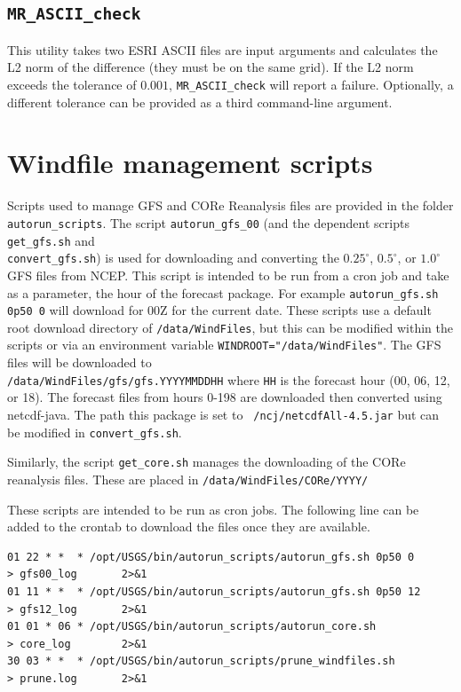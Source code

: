 \documentclass[11pt]{article}   %
\begin{document}
\subsection{\texttt{MR\_ASCII\_check}}
This utility takes two ESRI ASCII files are input arguments and calculates the L2 norm of
the difference (they must be on the same grid).  If the L2 norm exceeds the tolerance of
$0.001$, \texttt{MR\_ASCII\_check} will report a failure.  Optionally, a different tolerance
can be provided as a third command-line argument.

\section{Windfile management scripts}
Scripts used to manage GFS and CORe Reanalysis files are provided in the
folder \texttt{autorun\_scripts}.
The script \texttt{autorun\_gfs\_00} (and the dependent scripts
\texttt{get\_gfs.sh} and\\
\texttt{convert\_gfs.sh}) is used for downloading and
converting the $0.25^{\circ}$, $0.5^{\circ}$, or $1.0^{\circ}$ GFS files from NCEP.
This script is intended to be
run from a cron job and take as a parameter, the hour of the forecast package.  For example
\texttt{autorun\_gfs.sh 0p50 0} will download for 00Z for the current date.  These 
scripts use a default root download directory of \texttt{/data/WindFiles}, but this can
be modified within the scripts or via an environment variable \texttt{WINDROOT="/data/WindFiles"}.
The GFS files will be downloaded to\\
\texttt{/data/WindFiles/gfs/gfs.YYYYMMDDHH} where \texttt{HH} is the forecast hour
(00, 06, 12, or 18).  The forecast files from hours 0-198 are downloaded then converted using
netcdf-java.  The path this package is set to \texttt{~/ncj/netcdfAll-4.5.jar} but can be
modified in \texttt{convert\_gfs.sh}.

Similarly, the script \texttt{get\_core.sh} manages the downloading of 
the CORe reanalysis files.  These are placed in \texttt{/data/WindFiles/CORe/YYYY/}

These scripts are intended to be run as cron jobs.  The following line can be added to the
crontab to download the files once they are available.
\footnotesize
\begin{verbatim}
01 22 * *  * /opt/USGS/bin/autorun_scripts/autorun_gfs.sh 0p50 0            > gfs00_log       2>&1
01 11 * *  * /opt/USGS/bin/autorun_scripts/autorun_gfs.sh 0p50 12           > gfs12_log       2>&1
01 01 * 06 * /opt/USGS/bin/autorun_scripts/autorun_core.sh                  > core_log        2>&1
30 03 * *  * /opt/USGS/bin/autorun_scripts/prune_windfiles.sh               > prune.log       2>&1
\end{verbatim}
\normalsize
\end{document}
